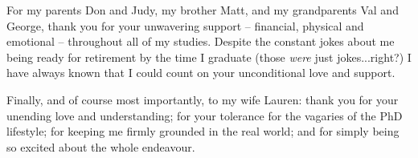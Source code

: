 For my parents Don and Judy, my brother Matt, and my grandparents Val and
George, thank you for your unwavering support -- financial, physical and emotional -- throughout all of my studies.  Despite the constant jokes about me being ready
for retirement by the time I graduate (those \emph{were} just jokes...right?) I
have always known that I could count on your unconditional love and support.

Finally, and of course most importantly, to my wife Lauren: thank you
for your unending love and understanding; for your tolerance for the vagaries of
the PhD lifestyle; for keeping me firmly grounded in the real
world; and for simply being so excited about the whole endeavour.




\singlespace
\cleardoublepage
\tableofcontents
\listoftables
\listoffigures
\listofalgorithms

\cleardoublepage
\onehalfspace
{}











\singlespace

\appendix





